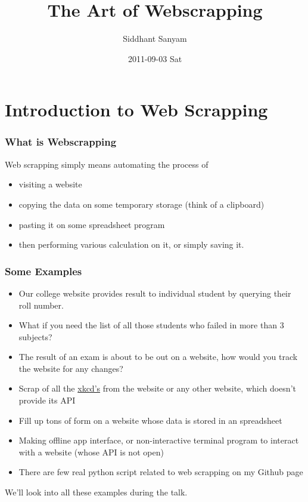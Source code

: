 \documentclass{beamer}
\title{The Art of Webscrapping}
\author{Siddhant Sanyam}
\date{2011-09-03 Sat}
\begin{document}
\maketitle




\section{Introduction to Web Scrapping}
\label{sec-1}
\begin{frame}
\frametitle{What is Webscrapping}
\label{sec-1_1}

   Web scrapping simply means automating the process of

\begin{itemize}
\item visiting a website
\item copying the data on some temporary storage (think of a clipboard)
\item pasting it on some spreadsheet program
\item then performing various calculation on it, or simply saving it.
\end{itemize}
\end{frame}
\begin{frame}
\frametitle{Some Examples}
\label{sec-1_2}


\begin{itemize}
\item Our college website provides result to individual student by querying their roll number.
\item What if you need the list of all those students who failed in more than 3 subjects?
\item The result of an exam is about to be out on a website, how would you track the website for any changes?
\item Scrap of all the \href{http://xkcd.com}{xkcd's} from the website or any other website, which doesn't provide its API
\item Fill up tons of form on a website whose data is stored in an spreadsheet
\item Making offline app interface, or non-interactive terminal program to interact with a website (whose API is not open)
\item There are few real python script related to web scrapping on my Github page
\end{itemize}
    We'll look into all these examples during the talk.
    
\end{frame}
\end{document}
